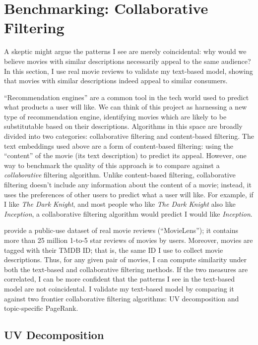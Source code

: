 \documentclass{article}
\begin{document}

\section{Benchmarking: Collaborative Filtering}

A skeptic might argue the patterns I see are merely coincidental: why would we believe movies with similar descriptions necessarily appeal to the same audience? In this section, I use real movie reviews to validate my text-based model, showing that movies with similar descriptions indeed appeal to similar consumers.

``Recommendation engines'' are a common tool in the tech world used to predict what products a user will like. We can think of this project as harnessing a new type of recommendation engine, identifying movies which are likely to be substitutable based on their descriptions. Algorithms in this space are broadly divided into two categories: collaborative filtering and content-based filtering. The text embeddings used above are a form of content-based filtering: using the ``content'' of the movie (its text description) to predict its appeal. However, one way to benchmark the quality of this approach is to compare against a \emph{collaborative} filtering algorithm. Unlike content-based filtering, collaborative filtering doesn't include any information about the content of a movie; instead, it uses the preferences of other users to predict what a user will like. For example, if I like \emph{The Dark Knight}, and most people who like \emph{The Dark Knight} also like \emph{Inception}, a collaborative filtering algorithm would predict I would like \emph{Inception}. 

\textcite{harper2016ATIIS} provide a public-use dataset of real movie reviews (``MovieLens''); it contains more than 25 million 1-to-5 star reviews of movies by users. Moreover, movies are tagged with their TMDB ID; that is, the same ID I use to collect movie descriptions. Thus, for any given pair of movies, I can compute similarity under both the text-based and collaborative filtering methods. If the two measures are correlated, I can be more confident that the patterns I see in the text-based model are not coincidental. I validate my text-based model by comparing it against two frontier collaborative filtering algorithms: UV decomposition and topic-specific PageRank.

\pagebreak

\subsection{UV Decomposition}
\end{document}

